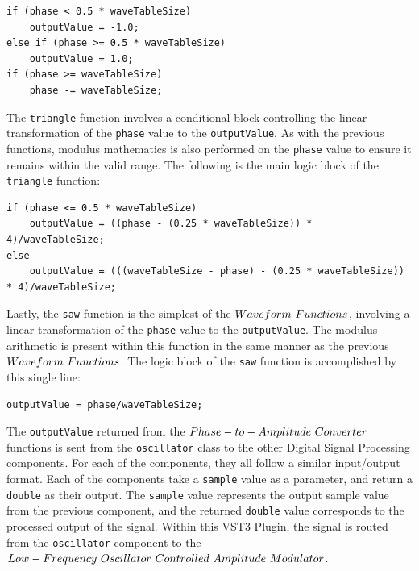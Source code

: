 \documentclass[a4paper,12pt]{report}
\begin{document}
 \noindent\begin{minipage}{\linewidth} \begin{lstlisting}[caption={The \texttt{square()} waveform function},label={code:square},captionpos=b]
if (phase < 0.5 * waveTableSize)
    outputValue = -1.0;
else if (phase >= 0.5 * waveTableSize)
    outputValue = 1.0;
if (phase >= waveTableSize)
    phase -= waveTableSize;
\end{lstlisting} \end{minipage}

The \texttt{triangle} function involves a conditional block controlling the linear transformation of the \texttt{phase} value to the \texttt{output\-Value}.  As with the previous functions, modulus mathematics is also performed on the \texttt{phase} value to ensure it remains within the valid range. The following is the main logic block of the \texttt{triangle} function:

 \noindent\begin{minipage}{\linewidth} \begin{lstlisting}[caption={The \texttt{triangle()} waveform function},label={code:triangle},captionpos=b]
if (phase <= 0.5 * waveTableSize)
    outputValue = ((phase - (0.25 * waveTableSize)) * 4)/waveTableSize;
else
    outputValue = (((waveTableSize - phase) - (0.25 * waveTableSize)) * 4)/waveTableSize;
\end{lstlisting} \end{minipage}

Lastly, the \texttt{saw} function is the simplest of the $Waveform\ \-Functions$, involving a linear transformation of the \texttt{phase} value to the \texttt{output\-Value}. The modulus arithmetic is present within this function in the same manner as the previous $Waveform\ \-Functions$. The logic block of the \texttt{saw} function is accomplished by this single line:

 \noindent\begin{minipage}{\linewidth} \begin{lstlisting}[caption={The \texttt{saw()} waveform function},label={code:saw},captionpos=b]
outputValue = phase/waveTableSize;
\end{lstlisting} \end{minipage}

The \texttt{output\-Value} returned from the $Phase-to-Amplitude\ \-Converter$ functions is sent from the \texttt{oscillator} class to the other Digital Signal Processing components. For each of the components, they all follow a similar input/output format. Each of the components take a \texttt{sample} value as a parameter, and return a \texttt{double} as their output. The \texttt{sample} value represents the output sample value from the previous component, and the returned \texttt{double} value corresponds to the processed output of the signal. Within this VST3 Plugin, the signal is routed from the \texttt{oscillator} component to the $Low-Frequency\ \-Oscillator\ \-Controlled\ \-Amplitude\ \-Modulator$.
\end{document}
